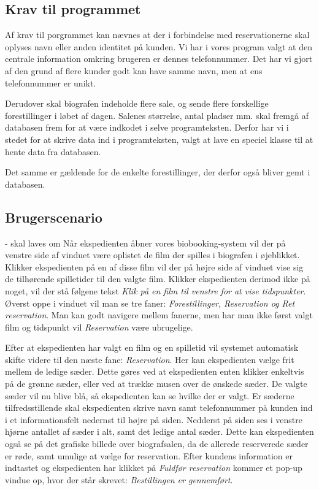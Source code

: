 \documentclass[final]{rapport1}
\begin{document}
\subsection{Krav til programmet}
Af krav til porgrammet kan nævnes at der i forbindelse med reservationerne skal oplyses navn eller anden identitet på kunden. Vi har i vores program valgt at den centrale information omkring brugeren er dennes telefonnummer. Det har vi gjort af den grund af flere kunder godt kan have samme navn, men at ens telefonnummer er unikt.  

Derudover skal biografen indeholde flere sale, og sende flere forskellige forestillinger i løbet af dagen. Salenes størrelse, antal pladser mm. skal fremgå af databasen frem for at være indkodet i selve programteksten. Derfor har vi i stedet for at skrive data ind i programteksten, valgt at lave en speciel klasse til at hente data fra databasen. 

Det samme er gældende for de enkelte forestillinger, der derfor også bliver gemt i databasen.

\subsection{Brugerscenario} - skal laves om
Når ekspedienten åbner vores biobooking-system vil der på venstre side af vinduet være oplistet de film der spilles i biografen i øjeblikket. Klikker ekspedienten på en af disse film vil der på højre side af vinduet vise sig de tilhørende spilletider til den valgte film. Klikker ekspedienten derimod ikke på noget, vil der stå følgene tekst \emph{Klik på en film til venstre for at vise tidspunkter}. Øverst oppe i vinduet vil man se tre faner: \emph{Forestillinger, Reservation og Ret reservation}. Man kan godt navigere mellem fanerne, men har man ikke først valgt film og tidspunkt vil \emph{Reservation} være ubrugelige.
 
Efter at ekspedienten har valgt en film og en spilletid vil systemet automatisk skifte videre til den næste fane: \emph{Reservation}. Her kan ekspedienten vælge frit mellem de ledige sæder. Dette gøres ved at ekspedienten enten klikker enkeltvis på de grønne sæder, eller ved at trække musen over de ønskede sæder. De valgte sæder vil nu blive blå, så ekspedienten kan se hvilke der er valgt. Er sæderne tilfredsstillende skal ekspedienten skrive navn samt telefonnummer på kunden ind i et informationsfelt nedernst til højre på siden. Nedderst på siden ses i venstre hjørne antallet af sæder i alt, samt det ledige antal sæder. Dette kan ekspedienten også se på det grafiske billede over biografsalen, da de allerede reserverede sæder er røde, samt umulige at vælge for reservation. Efter kundens information er indtastet og ekspedienten har klikket på \emph{Fuldfør reservation} kommer et pop-up vindue op, hvor der står skrevet: \emph{Bestillingen er gennemført}.
\end{document}
